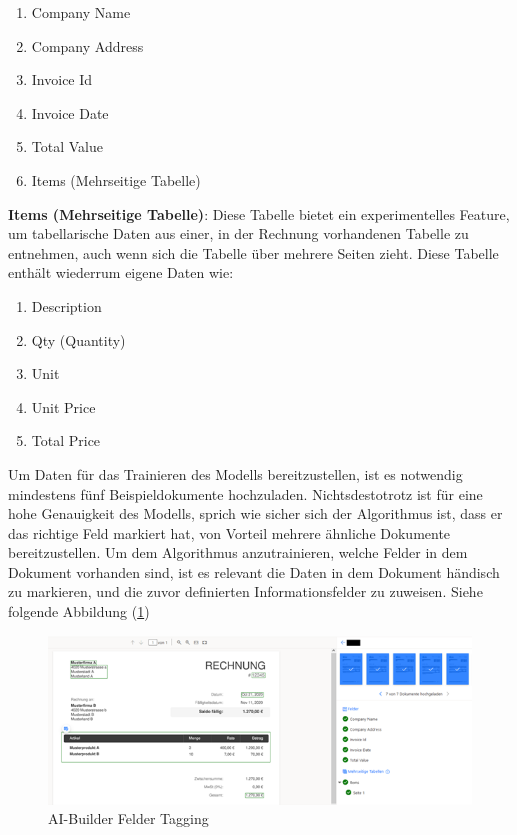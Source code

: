 \begin{enumerate}
    \item Company Name
    \item Company Address
    \item Invoice Id
    \item Invoice Date
    \item Total Value
    \item Items (Mehrseitige Tabelle)
\end{enumerate}

\textbf{Items (Mehrseitige Tabelle)}: Diese Tabelle bietet ein experimentelles Feature, um tabellarische Daten aus einer, in der Rechnung vorhandenen Tabelle zu entnehmen, auch wenn sich die Tabelle über mehrere Seiten zieht. Diese Tabelle enthält wiederrum eigene Daten wie:

\label{enum:InvoiceItemsAttributs}
\begin{enumerate}
    \item Description
    \item Qty (Quantity)
    \item Unit
    \item Unit Price
    \item Total Price
\end{enumerate}


Um Daten für das Trainieren des Modells bereitzustellen, ist es notwendig mindestens fünf Beispieldokumente hochzuladen. Nichtsdestotrotz ist für eine hohe Genauigkeit des Modells, sprich wie sicher sich der Algorithmus ist, dass er das richtige Feld markiert hat, von Vorteil mehrere ähnliche Dokumente bereitzustellen. 
Um dem Algorithmus anzutrainieren, welche Felder in dem Dokument vorhanden sind, ist es relevant die Daten in dem Dokument händisch zu markieren, und die zuvor definierten Informationsfelder zu zuweisen. Siehe folgende Abbildung (\ref{fig:ai-builder-tagging-figure})

\begin{figure}[h]
    \centering
    \includegraphics[scale=0.9]{sections/cloud-computing/images/ai-builder-tagging.png}
    \caption{AI-Builder Felder Tagging}
    \label{fig:ai-builder-tagging-figure}
\end{figure}
